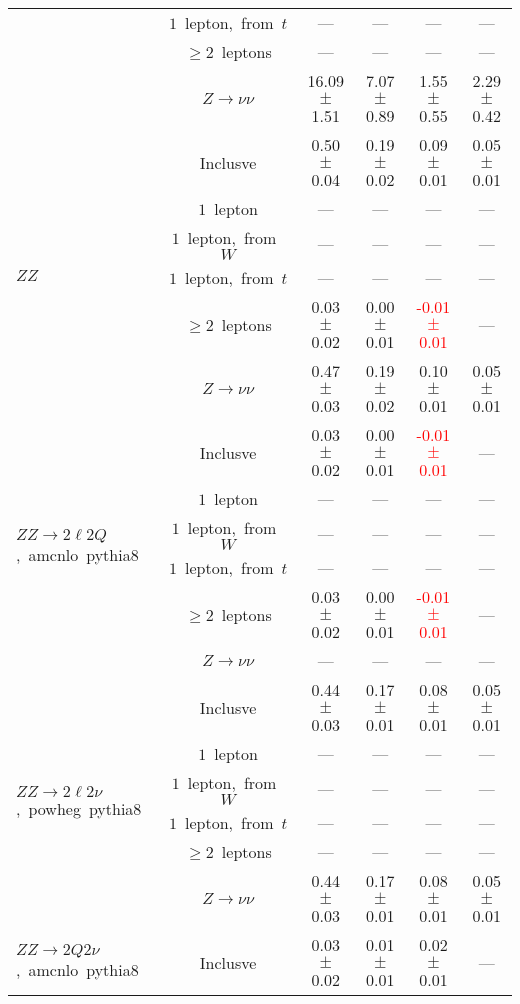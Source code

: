 \documentclass{article}
\begin{document}
\begin{longtable}{|l|c|c|c|c|c|}
 & $1$~lepton,~from~$t$  & ---  & ---  & ---  & --- \\* 
 & $\ge2$~leptons  & ---  & ---  & ---  & --- \\* 
 & $Z\rightarrow\nu\nu$  & 16.09 $\pm$ 1.51  & 7.07 $\pm$ 0.89  & 1.55 $\pm$ 0.55  & 2.29 $\pm$ 0.42 \\* 
\hline 
\multirow{6}{*}{$ZZ$} & Inclusve  & 0.50 $\pm$ 0.04  & 0.19 $\pm$ 0.02  & 0.09 $\pm$ 0.01  & 0.05 $\pm$ 0.01 \\* 
 & $1$~lepton  & ---  & ---  & ---  & --- \\* 
 & $1$~lepton,~from~$W$  & ---  & ---  & ---  & --- \\* 
 & $1$~lepton,~from~$t$  & ---  & ---  & ---  & --- \\* 
 & $\ge2$~leptons  & 0.03 $\pm$ 0.02  & 0.00 $\pm$ 0.01  & \textcolor{red}{ -0.01 $\pm$ 0.01 }  & --- \\* 
 & $Z\rightarrow\nu\nu$  & 0.47 $\pm$ 0.03  & 0.19 $\pm$ 0.02  & 0.10 $\pm$ 0.01  & 0.05 $\pm$ 0.01 \\* 
\hline 
\multirow{6}{*}{$ZZ{\rightarrow}2{\ell}2Q$,~amcnlo~pythia8} & Inclusve  & 0.03 $\pm$ 0.02  & 0.00 $\pm$ 0.01  & \textcolor{red}{ -0.01 $\pm$ 0.01 }  & --- \\* 
 & $1$~lepton  & ---  & ---  & ---  & --- \\* 
 & $1$~lepton,~from~$W$  & ---  & ---  & ---  & --- \\* 
 & $1$~lepton,~from~$t$  & ---  & ---  & ---  & --- \\* 
 & $\ge2$~leptons  & 0.03 $\pm$ 0.02  & 0.00 $\pm$ 0.01  & \textcolor{red}{ -0.01 $\pm$ 0.01 }  & --- \\* 
 & $Z\rightarrow\nu\nu$  & ---  & ---  & ---  & --- \\* 
\hline 
\multirow{6}{*}{$ZZ{\rightarrow}2{\ell}2{\nu}$,~powheg~pythia8} & Inclusve  & 0.44 $\pm$ 0.03  & 0.17 $\pm$ 0.01  & 0.08 $\pm$ 0.01  & 0.05 $\pm$ 0.01 \\* 
 & $1$~lepton  & ---  & ---  & ---  & --- \\* 
 & $1$~lepton,~from~$W$  & ---  & ---  & ---  & --- \\* 
 & $1$~lepton,~from~$t$  & ---  & ---  & ---  & --- \\* 
 & $\ge2$~leptons  & ---  & ---  & ---  & --- \\* 
 & $Z\rightarrow\nu\nu$  & 0.44 $\pm$ 0.03  & 0.17 $\pm$ 0.01  & 0.08 $\pm$ 0.01  & 0.05 $\pm$ 0.01 \\* 
\hline 
\multirow{6}{*}{$ZZ{\rightarrow}2Q2{\nu}$,~amcnlo~pythia8} & Inclusve  & 0.03 $\pm$ 0.02  & 0.01 $\pm$ 0.01  & 0.02 $\pm$ 0.01  & --- \\* 

\end{longtable}
\end{document}
